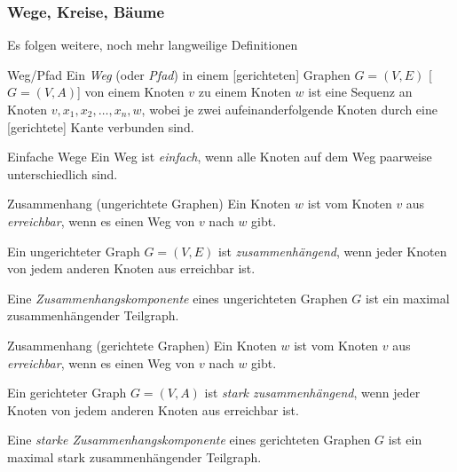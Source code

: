 \documentclass{panikzettel}
\begin{document}
\subsubsection{Wege, Kreise, Bäume}

Es folgen weitere, noch mehr langweilige Definitionen

\begin{thirdboxl}
	\vspace{-\baselineskip}	
	\begin{defi}{Weg/Pfad}
		Ein \emph{Weg} (oder \emph{Pfad}) in einem [gerichteten] Graphen $G = (V,E)$ [$G = (V,A)$] von einem Knoten $v$ zu einem Knoten $w$ ist eine Sequenz an Knoten $v, x_1, x_2, \dots , x_n, w$, wobei je zwei aufeinanderfolgende Knoten durch eine [gerichtete] Kante verbunden sind.
	\end{defi}
	
	\begin{defi}{Einfache Wege}
		Ein Weg ist \emph{einfach}, wenn alle Knoten auf dem Weg paarweise unterschiedlich sind.
	\end{defi}
\end{thirdboxl}%
\begin{thirdboxm}
	\vspace{-\baselineskip}		
	\begin{defi}{Zusammenhang (ungerichtete Graphen)}
		Ein Knoten $w$ ist vom Knoten $v$ aus \emph{erreichbar}, wenn es einen Weg von $v$ nach $w$ gibt.
		
		Ein ungerichteter Graph $G= (V,E)$ ist \emph{zusammenhängend}, wenn jeder Knoten von jedem anderen Knoten aus erreichbar ist.
		
		Eine \emph{Zusammenhangskomponente} eines ungerichteten Graphen $G$ ist ein maximal zusammenhängender Teilgraph.
	\end{defi}
	
\end{thirdboxm}%
\begin{thirdboxr}
	\vspace{-\baselineskip}	
	\begin{defi}{Zusammenhang (gerichtete Graphen)}
		Ein Knoten $w$ ist vom Knoten $v$ aus \emph{erreichbar}, wenn es einen Weg von $v$ nach $w$ gibt.
		
		Ein gerichteter Graph $G= (V,A)$ ist \emph{stark zusammenhängend}, wenn jeder Knoten von jedem anderen Knoten aus erreichbar ist.
		
		Eine \emph{starke Zusammenhangskomponente} eines gerichteten Graphen $G$ ist ein maximal stark zusammenhängender Teilgraph.
	\end{defi}
	
\end{thirdboxr}
\end{document}
